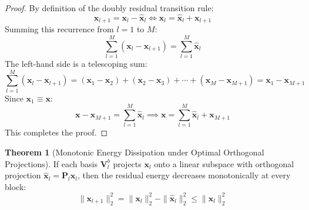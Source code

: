 \documentclass[11pt,a4paper]{article}
\theoremstyle{definition}
\newtheorem{theorem}{\textbf{Theorem}}[section]
\begin{document}
\begin{proof}
By definition of the doubly residual transition rule:
{\boldmath
\begin{equation}
\mathbf{x}_{l+1} = \mathbf{x}_l - \widehat{\mathbf{x}}_l \iff \mathbf{x}_l = \widehat{\mathbf{x}}_l + \mathbf{x}_{l+1}
\end{equation}
}
Summing this recurrence from $l = 1$ to $M$:
{\boldmath
\begin{equation}
\sum_{l=1}^M (\mathbf{x}_l - \mathbf{x}_{l+1}) = \sum_{l=1}^M \widehat{\mathbf{x}}_l
\end{equation}
}
The left-hand side is a telescoping sum:
{\boldmath
\begin{equation}
\sum_{l=1}^M (\mathbf{x}_l - \mathbf{x}_{l+1}) = (\mathbf{x}_1 - \mathbf{x}_2) + (\mathbf{x}_2 - \mathbf{x}_3) + \cdots + (\mathbf{x}_M - \mathbf{x}_{M+1}) = \mathbf{x}_1 - \mathbf{x}_{M+1}
\end{equation}
}
Since $\mathbf{x}_1 \equiv \mathbf{x}$:
{\boldmath
\begin{equation}
\mathbf{x} - \mathbf{x}_{M+1} = \sum_{l=1}^M \widehat{\mathbf{x}}_l \implies \mathbf{x} = \sum_{l=1}^M \widehat{\mathbf{x}}_l + \mathbf{x}_{M+1}
\end{equation}
}
This completes the proof.
\end{proof}

\begin{theorem}[Monotonic Energy Dissipation under Optimal Orthogonal Projections]
If each basis $\mathbf{V}_l^b$ projects $\mathbf{x}_l$ onto a linear subspace with orthogonal projection $\widehat{\mathbf{x}}_l = \mathbf{P}_l \mathbf{x}_l$, then the residual energy decreases monotonically at every block:
{\boldmath
\begin{equation}
\|\mathbf{x}_{l+1}\|_2^2 = \|\mathbf{x}_l\|_2^2 - \|\widehat{\mathbf{x}}_l\|_2^2 \le \|\mathbf{x}_l\|_2^2
\end{equation}
}
\end{theorem}
\end{document}
